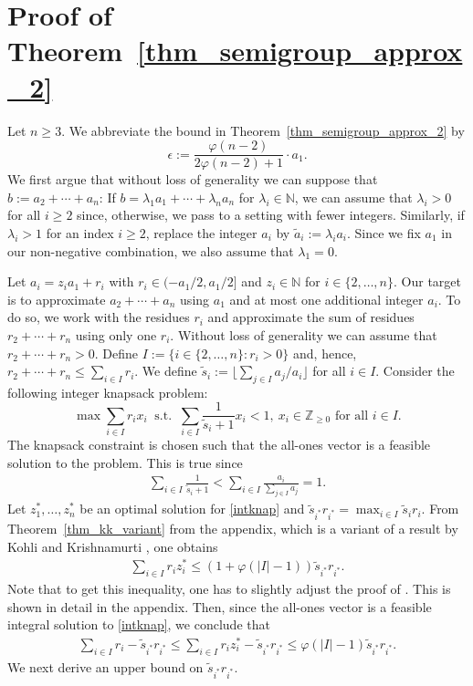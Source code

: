 \documentclass[pdflatex]{sn-jnl}
\newcommand{\Z}{\mathbb{Z}}
\newcommand{\N}{\mathbb{N}}
\theoremstyle{thmstyleone}%
\theoremstyle{thmstyletwo}%
\theoremstyle{thmstylethree}%
\begin{document}
	
	\section{Proof of Theorem~\ref{thm_semigroup_approx_2}}
	\label{s_proof_thm_semigroup_approx_2}
	Let $n\geq 3$. We abbreviate the bound in Theorem~\ref{thm_semigroup_approx_2} by 
	$$\epsilon := \frac{\varphi(n - 2)}{2\varphi(n - 2) + 1}\cdot a_1.$$  
	We first argue that without loss of generality we can suppose that $b := a_2+\cdots+ a_n$: 		
	If $b = \lambda_1 a_1 + \cdots + \lambda_n a_n$ for $\lambda_i\in \N$, we can assume that $\lambda_i > 0$ for all $i\geq 2$ since, otherwise, we pass to a setting with fewer integers. 
	Similarly, if $\lambda_i > 1$ for  an index $i\geq 2$, replace the integer $a_i$ by $\tilde{a}_i :=\lambda_i a_i$. 
	Since we fix $a_1$ in our non-negative combination, we also assume that $\lambda_1 = 0$.
	
	Let $a_i = z_ia_1 +  r_i$ with $r_i\in  (- a_1 / 2,a_1/2\rbrack$ and $z_i\in\N $ for $i\in\lbrace 2,\ldots,n\rbrace$.  Our target is to approximate $a_2 + \cdots + a_n$ using $a_1$ and at most one additional integer $a_i$. To do so, we work with the residues $r_i$ and approximate the sum of residues $r_2 + \cdots + r_n$ using only one $r_i$. Without loss of generality we can assume that $r_2 + \cdots + r_n > 0$. Define $I := \lbrace i\in\lbrace 2,\ldots,n\rbrace : r_i > 0\rbrace$ and, hence, $r_2 + \cdots + r_n \leq \sum_{i\in I}r_i$. We define $\tilde{s}_i := \lfloor \sum_{j\in I} a_j / a_i \rfloor$ for all $i\in I$. 
	Consider the following integer knapsack problem:
	\begin{equation}\label{intknap}
		\max \sum_{i\in I}r_ix_i \ \text{ s.t. } \ \sum_{i\in I}\frac{1}{\tilde{s}_i + 1}x_i < 1, \ x_i\in\Z_{\geq 0} \text{ for all }i\in I.
	\end{equation}
	The knapsack constraint is chosen such that the all-ones vector is a feasible solution to the problem. This is true since
	\begin{align*}
		\sum_{i\in I}\frac{1}{\tilde{s}_{i} + 1} < \sum_{i\in I}\frac{a_i}{\sum_{j\in I}a_j} = 1.
	\end{align*}
	Let $z_1^*,\ldots,z^*_n$ be an optimal solution for \eqref{intknap} and $\tilde{s}_{i^*}r_{i^*} = \max_{i\in I} \tilde{s}_i r_i$. From Theorem~\ref{thm_kk_variant} from the appendix, which is a variant of a result by Kohli and Krishnamurti \cite[Theorem 2]{kohlikrishna1992greedyknapsack},
	one obtains
	\begin{align*}
		\sum_{i\in I}r_iz^*_i\leq \left(1 + \varphi(|I| - 1)\right) \tilde{s}_{i^*}r_{i^*}. 
	\end{align*}
	Note that to get this inequality, one has to slightly adjust the proof of \cite[Theorem 2]{kohlikrishna1992greedyknapsack}.
	This is shown in detail in the appendix.
	Then, since the all-ones vector is a feasible integral solution to \eqref{intknap}, we conclude that
	\begin{align}
		\label{inequ_semigroup_proof_k=2}
		\sum_{i\in I}r_i - \tilde{s}_{i^*}r_{i^*}\leq \sum_{i\in I} r_iz^*_i - \tilde{s}_{i^*}r_{i^*}\leq \varphi(|I| - 1) \tilde{s}_{i^*}r_{i^*}.
	\end{align}
	We next derive an upper bound on $\tilde{s}_{i^*}r_{i^*}$. 
	
\end{document}
